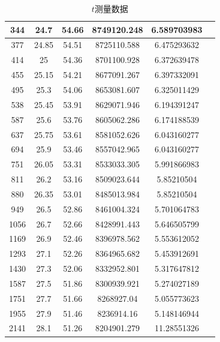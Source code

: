 \documentclass[ctex]{article}
\begin{document}
\begin{table}[H]
\begin{tabular}{|c|c| c|c |c |c|}
        344 & 24.7 & 54.66 & 8749120.248 & 6.589703983 \\ \hline
        377 & 24.85 & 54.51 & 8725110.588 & 6.475293632 \\ \hline
        414 & 25 & 54.36 & 8701100.928 & 6.372639478 \\ \hline
        455 & 25.15 & 54.21 & 8677091.267 & 6.397332091 \\ \hline
        495 & 25.3 & 54.06 & 8653081.607 & 6.325011429 \\ \hline
        538 & 25.45 & 53.91 & 8629071.946 & 6.194391247 \\ \hline
        587 & 25.6 & 53.76 & 8605062.286 & 6.174188539 \\ \hline
        637 & 25.75 & 53.61 & 8581052.626 & 6.043160277 \\ \hline
        694 & 25.9 & 53.46 & 8557042.965 & 6.043160277 \\ \hline
        751 & 26.05 & 53.31 & 8533033.305 & 5.991866983 \\ \hline
        811 & 26.2 & 53.16 & 8509023.644 & 5.85210504 \\ \hline
        880 & 26.35 & 53.01 & 8485013.984 & 5.85210504 \\ \hline
        949 & 26.5 & 52.86 & 8461004.324 & 5.701064783 \\ \hline
        1056 & 26.7 & 52.66 & 8428991.443 & 5.646505799 \\ \hline
        1169 & 26.9 & 52.46 & 8396978.562 & 5.553612052 \\ \hline
        1293 & 27.1 & 52.26 & 8364965.682 & 5.453912691 \\ \hline
        1430 & 27.3 & 52.06 & 8332952.801 & 5.317647812 \\ \hline
        1587 & 27.5 & 51.86 & 8300939.921 & 5.274027189 \\ \hline
        1751 & 27.7 & 51.66 & 8268927.04 & 5.055773623 \\ \hline
        1955 & 27.9 & 51.46 & 8236914.16 & 5.148146944 \\ \hline
        2141 & 28.1 & 51.26 & 8204901.279 & 11.28551326 \\ \hline
\end{tabular}

    \caption{$t$测量数据}
    \label{tab:my_label}
\end{table}
\end{document}
